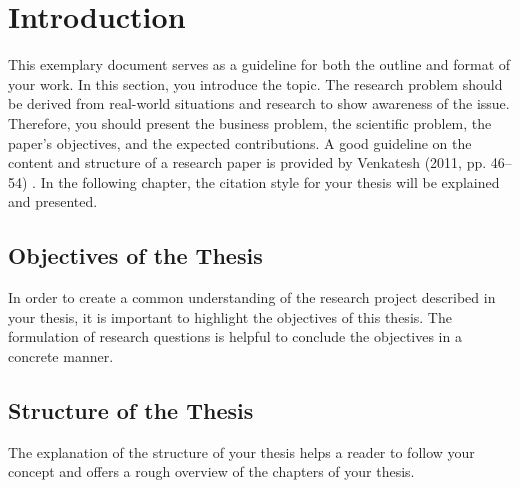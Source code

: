 \chapter{Introduction}

This exemplary document serves as a guideline for both the outline and format of your work. In this section, you introduce the topic. The research problem should be derived from real-world situations and research to show awareness of the issue. Therefore, you should present the business problem, the scientific problem, the paper’s objectives, and the expected contributions. A good guideline on the content and structure of a research paper is provided by Venkatesh (2011, pp. 46–54) \cite{beaulieu_road_2012}. In the following chapter, the citation style for your thesis will be explained and presented.

\section{Objectives of the Thesis}
\hspace{1cm}
In order to create a common understanding of the research project described in your thesis, it is important to highlight the objectives of this thesis. The formulation of research questions is helpful to conclude the objectives in a concrete manner.
\section{Structure of the Thesis}
The explanation of the structure of your thesis helps a reader to follow your concept and offers a rough overview of the chapters of your thesis.